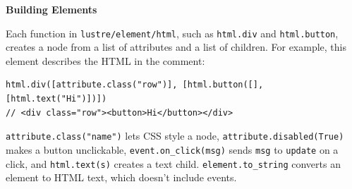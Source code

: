 \vspace{0.5\baselineskip}
\begin{blocksection}
\textbf{Building Elements}

Each function in \lstinline$lustre/element/html$, such as \lstinline$html.div$ and \lstinline$html.button$, creates a node from a list of attributes and a list of children. For example, this element describes the HTML in the comment:
\begin{lstlisting}
html.div([attribute.class("row")], [html.button([], [html.text("Hi")])])
// <div class="row"><button>Hi</button></div>
\end{lstlisting}
\lstinline$attribute.class("name")$ lets CSS style a node, \lstinline$attribute.disabled(True)$ makes a button unclickable, \lstinline$event.on_click(msg)$ sends \lstinline$msg$ to \lstinline$update$ on a click, and \lstinline$html.text(s)$ creates a text child. \lstinline$element.to_string$ converts an element to HTML text, which doesn't include events.
\end{blocksection}